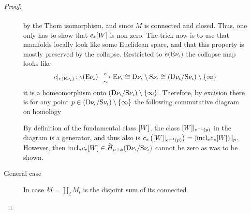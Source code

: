 \begin{Lem}
\begin{proof}
\begin{description}
\begin{gather*}
      \end{gather*}
      by the Thom isomorphism, and since $M$ is connected and closed.
      Thus, one only has to show that
      ${c}_*[ W]$
      is non-zero.
      The trick now is to use that manifolds locally look like some
      Euclidean space, and that this property is mostly preserved by
      the collapse.
      Restricted to $e(\mathrm{E}\nu_{{\iota}})$ the collapse map looks like
      \begin{gather*}
        c|_{e(\mathrm{E}\nu_{{\iota}})}\colon
        e(\mathrm{E}\nu_{{\iota}})
        \overset{e}{\underset{\sim}{\longrightarrow}} \mathrm{E}\nu_{{\iota}}
        \cong \mathrm{D}\nu_{{\iota}}\setminus\mathrm{S}\nu_{\iota}
        \cong (\mathrm{D}\nu_{{\iota}}/\mathrm{S}\nu_{{\iota}})\setminus \{\infty\}
      \end{gather*}
      \idest it is a homeomorphism onto
      $(\mathrm{D}\nu_{{\iota}}/\mathrm{S}\nu_{{\iota}})\setminus\{\infty\}$.
      Therefore, by excision there is for any point
      $p\in(\mathrm{D}\nu_{{\iota}}/\mathrm{S}\nu_{{\iota}})\setminus\{\infty\}$
      the following commutative diagram on homology
      \begin{center}
      \end{center}
      By definition of the fundamental class $[ W]$,
      the class $[ W]|_{c^{-1}(p)}$ in the
      diagram is a generator, and thus also is
      ${c}_*\left([ W]|_{c^{-1}(p)}\right)
      = \left({\mathrm{incl}}_*{c}_*[ W]\right)|_p$.
      However, then ${\mathrm{incl}}_*{c}_*[ W]\in
      \widetilde{H}_{n+k}(\mathrm{D}\nu_{{\iota}}/\mathrm{S}\nu_{{\iota}})$
      cannot be zero as was to be shown.
    \item[General case] In case $M=\coprod_i M_i$ is the disjoint sum of its connected

\end{description}
\end{proof}
\end{Lem}
